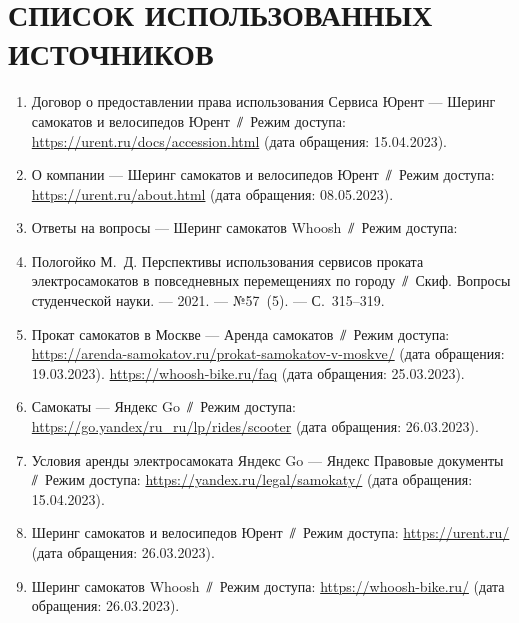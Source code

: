 \chapter*{СПИСОК ИСПОЛЬЗОВАННЫХ ИСТОЧНИКОВ}

\begin{enumerate}
    \item \label{urent-reqs} Договор о предоставлении права использования Сервиса Юрент --- Шеринг самокатов и велосипедов Юрент~$\sslash$~Режим доступа: \url{https://urent.ru/docs/accession.html} (дата обращения: 15.04.2023).
    \item \label{urent-cities} О компании --- Шеринг самокатов и велосипедов Юрент~$\sslash$~Режим доступа: \url{https://urent.ru/about.html} (дата обращения: 08.05.2023).
    \item \label{whoosh-reqs} Ответы на вопросы --- Шеринг самокатов Whoosh~$\sslash$~Режим доступа:
    \item \label{popularity} Пологойко М.~Д. Перспективы использования сервисов проката электросамокатов в повседневных перемещениях по городу~$\sslash$~Скиф. Вопросы студенческой науки. --- 2021. --- №57~(5). --- С.~315--319.
    \item \label{hype} Прокат самокатов в Москве --- Аренда самокатов~$\sslash$~Режим доступа: \url{https://arenda-samokatov.ru/prokat-samokatov-v-moskve/} (дата обращения: 19.03.2023).
          \url{https://whoosh-bike.ru/faq} (дата обращения: 25.03.2023).
    \item \label{yago} Самокаты --- Яндекс Go~$\sslash$~Режим доступа: \url{https://go.yandex/ru_ru/lp/rides/scooter} (дата обращения: 26.03.2023).
    \item \label{yago-reqs} Условия аренды электросамоката Яндекс Go --- Яндекс Правовые документы~$\sslash$~Режим доступа: \url{https://yandex.ru/legal/samokaty/} (дата обращения: 15.04.2023).
    \item \label{urent} Шеринг самокатов и велосипедов Юрент~$\sslash$~Режим доступа: \url{https://urent.ru/} (дата обращения: 26.03.2023).
    \item \label{whoosh} Шеринг самокатов Whoosh~$\sslash$~Режим доступа: \url{https://whoosh-bike.ru/} (дата обращения: 26.03.2023).
\end{enumerate}